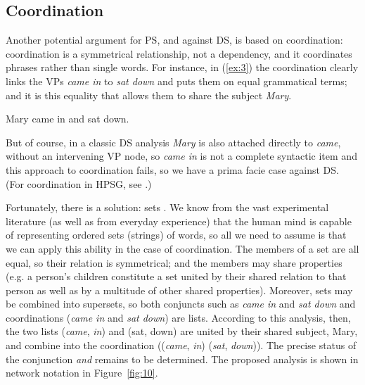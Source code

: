 \documentclass[output=paper]{langscibook}
\begin{document}
\subsection{Coordination}
\label{sec:4.2}

Another potential argument for PS, and against DS, is based on coordination: coordination is a symmetrical relationship, not a dependency, and it coordinates phrases rather than single words. For instance, in (\ref{ex:3}) the coordination clearly links the VPs \emph{came in} to \emph{sat down} and puts them on equal grammatical terms; and it is this equality that allows them to share the subject \emph{Mary}.

\begin{exe}
	\ex \label{ex:3} Mary came in and sat down.
\end{exe}

But of course, in a classic DS analysis \emph{Mary} is also attached directly to \emph{came}, without an intervening VP node, so \emph{came in} is not a complete syntactic item and this approach to coordination fails, so we have a prima facie case against DS. (For coordination in HPSG, see .)

Fortunately, there is a solution: sets \citep[404--421]{Hudson90a-u}. We know from the vast experimental literature (as well as from everyday experience) that the human mind is capable of representing ordered sets (strings) of words, so all we need to assume is that we can apply this ability in the case of coordination. The members of a set are all equal, so their relation is symmetrical; and the members may share properties (e.g. a person’s children constitute a set united by their shared relation to that person as well as by a multitude of other shared properties). Moreover, sets may be combined into supersets, so both conjuncts such as \emph{came in} and \emph{sat down} and coordinations (\emph{came in} and \emph{sat down}) are lists. According to this analysis, then, the two lists (\emph{came}, \emph{in}) and (sat, down) are united by their shared subject, Mary, and combine into the coordination ((\emph{came}, \emph{in}) (\emph{sat}, \emph{down})). The precise status of the conjunction \emph{and} remains to be determined. The proposed analysis is shown in network notation in Figure~\ref{fig:10}.
\end{document}
